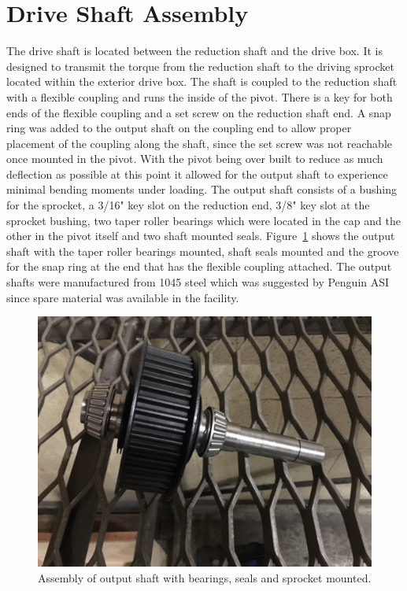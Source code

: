 \section{Drive Shaft Assembly}
The drive shaft is located between the reduction shaft and the drive box. It is designed to transmit the torque from the reduction shaft to the driving sprocket located within the exterior drive box. The shaft is coupled to the reduction shaft with a flexible coupling and runs the inside of the pivot. There is a key for both ends of the flexible coupling and a set screw on the reduction shaft end. A snap ring was added to the output shaft on the coupling end to allow proper placement of the coupling along the shaft, since the set screw was not reachable once mounted in the pivot. With the pivot being over built to reduce as much deflection as possible at this point it allowed for the output shaft to experience minimal bending moments under loading. The output shaft consists of a bushing for the sprocket, a 3/16" key slot on the reduction end, 3/8" key slot at the sprocket bushing, two taper roller bearings which were located in the cap and the other in the pivot itself and two shaft mounted seals. Figure~\ref{fig:output_shaft} shows the output shaft with the taper roller bearings mounted, shaft seals mounted and the groove for the snap ring at the end that has the flexible coupling attached. The output shafts were manufactured from 1045 steel which was suggested by Penguin ASI since spare material was available in the facility.
\begin{figure}[htbp]
	\includegraphics[width=\linewidth]{images/drive_shaft_assembly_bld.jpg}
	\caption{Assembly of output shaft with bearings, seals and sprocket mounted.}
	\label{fig:output_shaft}
\end{figure}
